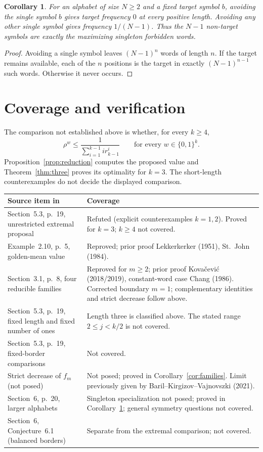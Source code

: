 \documentclass[11pt]{article}
\newtheorem{corollary}[theorem]{Corollary}
\begin{document}
\begin{corollary}\label{cor:alphabet}
For an alphabet of size $N\geq2$ and a fixed target symbol $b$, avoiding
the single symbol $b$ gives target frequency $0$ at every positive length.
Avoiding any other single symbol gives frequency $1/(N-1)$.
Thus the $N-1$ non-target symbols are exactly the maximizing singleton
forbidden words.
\end{corollary}
\begin{proof}
Avoiding a single symbol leaves $(N-1)^n$ words of length $n$.
If the target remains available, each of the $n$ positions is the target
in exactly $(N-1)^{n-1}$ such words. Otherwise it never occurs.
\end{proof}

\section{Coverage and verification}
The comparison not established above is whether, for every $k\geq4$,
\[
 \rho^w\leq\frac{1}{\sum_{i=1}^{k-1}i r_{k-1}^i}
 \qquad\text{for every }w\in\{0,1\}^k.
\]
Proposition~\ref{prop:reduction} computes the proposed value and
Theorem~\ref{thm:three} proves its optimality for $k=3$.
The short-length counterexamples do not decide the displayed comparison.

\begin{center}\small
\begin{tabular}{@{}p{.34\linewidth}p{.59\linewidth}@{}}
\toprule
Source item in~\cite{BMR}&Coverage\\\midrule
Section~5.3, p.~19, unrestricted extremal proposal&Refuted (explicit
counterexamples $k=1,2$). Proved for $k=3$; $k\geq4$ not covered.\\
Example~2.10, p.~5, golden-mean value&Reproved; prior proof
Lekkerkerker (1951), St.~John (1984).\\
Section~3.1, p.~8, four reducible families&Reproved for $m\geq2$;
prior proof Kova\v{c}evi\'c (2018/2019), constant-word case Chang (1986).
Corrected boundary $m=1$; complementary identities and strict decrease follow above.\\
Section~5.3, p.~19, fixed length and fixed number of ones&Length
three is classified above. The stated range $2\leq j<k/2$ is not covered.\\
Section~5.3, p.~19, fixed-border comparisons&Not covered.\\
Strict decrease of $f_m$ (not posed)&Not posed; proved in
Corollary~\ref{cor:families}. Limit previously given by Baril--Kirgizov--Vajnovszki (2021).\\
Section~6, p.~20, larger alphabets&Singleton specialization not posed; proved in
Corollary~\ref{cor:alphabet}; general symmetry questions not covered.\\
Section~6, Conjecture~6.1 (balanced borders)&Separate from the
extremal comparison; not covered.\\
\bottomrule
\end{tabular}
\end{center}
\end{document}
